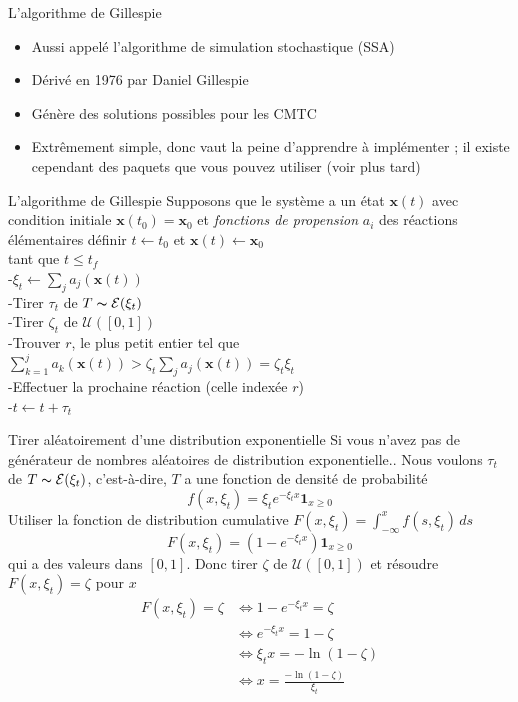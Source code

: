 \documentclass[aspectratio=169]{beamer}\usepackage[]{graphicx}\usepackage[]{xcolor}
\begin{document}
\begin{frame}{L'algorithme de Gillespie}
    \begin{itemize}
        \item Aussi appelé l'algorithme de simulation stochastique (SSA)
        \vfill
        \item Dérivé en 1976 par Daniel Gillespie
        \vfill
        \item Génère des solutions possibles pour les CMTC
        \vfill
        \item Extrêmement simple, donc vaut la peine d'apprendre à implémenter ; il existe cependant des paquets que vous pouvez utiliser (voir plus tard)
    \end{itemize}
\end{frame}


\begin{frame}{L'algorithme de Gillespie}
Supposons que le système a un état $\mathbf{x}(t)$ avec condition initiale $\mathbf{x}(t_0)=\mathbf{x}_0$ et \emph{fonctions de propension} $a_i$ des réactions élémentaires
\vfill
définir $t\leftarrow t_0$ et $\mathbf{x}(t)\leftarrow \mathbf{x}_0$\\
tant que {$t\leq t_f$}\\
-\qquad $\xi_t\leftarrow \sum_j a_j(\mathbf{x}(t))$\\
-\qquad Tirer $\tau_t$ de $T\thicksim \mathcal{E}(\xi_t)$\\
-\qquad Tirer $\zeta_t$ de $\mathcal{U}([0,1])$\\
-\qquad Trouver $r$, le plus petit entier tel que $\sum_{k=1}^j a_k(\mathbf{x}(t))> \zeta_t\sum_j a_j(\mathbf{x}(t))=\zeta_t\xi_t$\\
-\qquad Effectuer la prochaine réaction (celle indexée $r$)\\
-\qquad $t\leftarrow t+\tau_t$\\
\end{frame}


\begin{frame}{Tirer aléatoirement d'une distribution exponentielle}
    Si vous n'avez pas de générateur de nombres aléatoires de distribution exponentielle.. Nous voulons $\tau_t$ de $T\thicksim\mathcal{E}(\xi_t)$, c'est-à-dire, $T$ a une fonction de densité de probabilité
    $$
    f(x,\xi_t)=
    \xi_te^{-\xi_t x}\mathbf{1}_{x\geq 0}
    $$
    Utiliser la fonction de distribution cumulative $F(x,\xi_t)=\int_{-\infty}^x f(s,\xi_t)\,ds$
    $$
    F(x,\xi_t)=
    (1-e^{-\xi_t x})\mathbf{1}_{x\geq 0}
    $$
    qui a des valeurs dans $[0,1]$. Donc tirer $\zeta$ de $\mathcal{U}([0,1])$ et résoudre $F(x,\xi_t)=\zeta$ pour $x$
    \begin{align*}
    F(x,\xi_t)=\zeta & \Leftrightarrow 1-e^{-\xi_tx}=\zeta \\
    &\Leftrightarrow e^{-\xi_tx} = 1-\zeta \\
    &\Leftrightarrow \xi_tx = -\ln(1-\zeta) \\
    &\Leftrightarrow \boxed{x = \frac{-\ln(1-\zeta)}{\xi_t}}
    \end{align*}
\end{frame}
\end{document}
